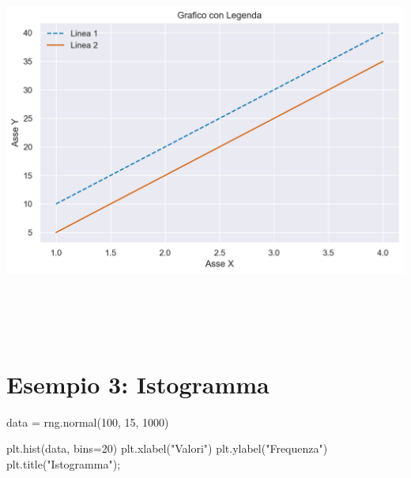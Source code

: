 \documentclass[
  letterpaper,
  krantz2]{{[}./krantz{]}}
\newenvironment{Shaded}{\begin{snugshade}}{\end{snugshade}}
\newcommand{\DecValTok}[1]{\textcolor[rgb]{0.68,0.00,0.00}{#1}}
\newcommand{\NormalTok}[1]{\textcolor[rgb]{0.00,0.23,0.31}{#1}}
\newcommand{\OperatorTok}[1]{\textcolor[rgb]{0.37,0.37,0.37}{#1}}
\newcommand{\StringTok}[1]{\textcolor[rgb]{0.13,0.47,0.30}{#1}}
\begin{document}
\includegraphics[width=7.61458in,height=5.11458in]{chapters/python/07_matplotlib_files/figure-pdf/cell-5-output-1.png}

\section{Esempio 3: Istogramma}\label{esempio-3-istogramma}

\begin{Shaded}
\begin{Highlighting}[]
\NormalTok{data }\OperatorTok{=}\NormalTok{ rng.normal(}\DecValTok{100}\NormalTok{, }\DecValTok{15}\NormalTok{, }\DecValTok{1000}\NormalTok{)}

\NormalTok{plt.hist(data, bins}\OperatorTok{=}\DecValTok{20}\NormalTok{)}
\NormalTok{plt.xlabel(}\StringTok{"Valori"}\NormalTok{)}
\NormalTok{plt.ylabel(}\StringTok{"Frequenza"}\NormalTok{)}
\NormalTok{plt.title(}\StringTok{"Istogramma"}\NormalTok{)}\OperatorTok{;}
\end{Highlighting}
\end{Shaded}
\end{document}
